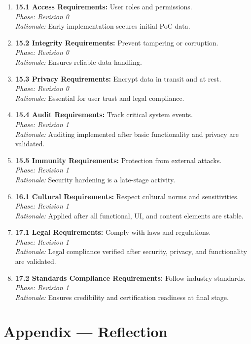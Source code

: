 \documentclass[12pt]{article}
\begin{document}
\begin{enumerate}
    \item \textbf{15.1 Access Requirements:} User roles and permissions.\\
    \textit{Phase: Revision 0} \\
    \textit{Rationale:} Early implementation secures initial PoC data.

    \item \textbf{15.2 Integrity Requirements:} Prevent tampering or corruption.\\
    \textit{Phase: Revision 0} \\
    \textit{Rationale:} Ensures reliable data handling.

    \item \textbf{15.3 Privacy Requirements:} Encrypt data in transit and at rest.\\
    \textit{Phase: Revision 0} \\
    \textit{Rationale:} Essential for user trust and legal compliance.

    \item \textbf{15.4 Audit Requirements:} Track critical system events.\\
    \textit{Phase: Revision 1} \\
    \textit{Rationale:} Auditing implemented after basic functionality and privacy are validated.

    \item \textbf{15.5 Immunity Requirements:} Protection from external attacks.\\
    \textit{Phase: Revision 1} \\
    \textit{Rationale:} Security hardening is a late-stage activity.

    \item \textbf{16.1 Cultural Requirements:} Respect cultural norms and sensitivities.\\
    \textit{Phase: Revision 1} \\
    \textit{Rationale:} Applied after all functional, UI, and content elements are stable.

    \item \textbf{17.1 Legal Requirements:} Comply with laws and regulations.\\
    \textit{Phase: Revision 1} \\
    \textit{Rationale:} Legal compliance verified after security, privacy, and functionality are validated.

    \item \textbf{17.2 Standards Compliance Requirements:} Follow industry standards.\\
    \textit{Phase: Revision 1} \\
    \textit{Rationale:} Ensures credibility and certification readiness at final stage.
\end{enumerate}


\newpage{}
\section*{Appendix --- Reflection}




\end{document}
